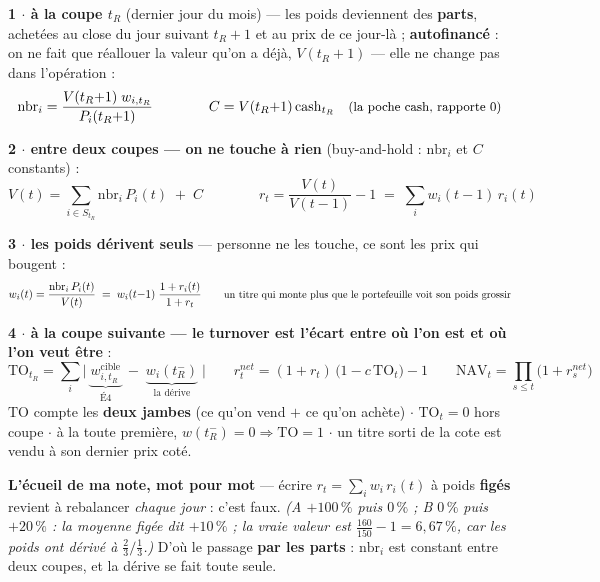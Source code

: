 \documentclass[11pt,a4paper]{article}
\begin{document}
\textbf{1 $\cdot$ à la coupe $t_R$} (dernier jour du mois) --- les poids deviennent des \textbf{parts}, achetées au close du jour suivant $t_R{+}1$
et au prix de ce jour-là ; \textbf{autofinancé} : on ne fait que réallouer la valeur qu'on a déjà, $V(t_R{+}1)$ --- elle ne change pas dans l'opération :
\[
\mathrm{nbr}_i = \frac{V(t_R{+}1)\; w_{i,t_R}}{P_i(t_R{+}1)}
\qquad\qquad
C = V(t_R{+}1)\,\mathrm{cash}_{t_R} \quad \text{\small(la poche cash, rapporte $0$)}
\]

\textbf{2 $\cdot$ entre deux coupes --- on ne touche à rien} (buy-and-hold : $\mathrm{nbr}_i$ et $C$ constants) :
\[
V(t) = \sum_{i \in S_{t_R}} \mathrm{nbr}_i\, P_i(t) \;+\; C
\qquad\qquad
r_t = \frac{V(t)}{V(t-1)} - 1 \;=\; \sum_i w_i(t{-}1)\, r_i(t)
\]

\textbf{3 $\cdot$ les poids dérivent seuls} --- personne ne les touche, ce sont les prix qui bougent :
\[
w_i(t) = \frac{\mathrm{nbr}_i\, P_i(t)}{V(t)} \;=\; w_i(t{-}1)\;\frac{1 + r_i(t)}{1 + r_t}
\qquad \text{\small un titre qui monte plus que le portefeuille voit son poids grossir}
\]

\textbf{4 $\cdot$ à la coupe suivante --- le turnover est l'écart entre où l'on est et où l'on veut être} :
\[
\mathrm{TO}_{t_R} = \sum_i \bigl|\; \underbrace{w^{\text{cible}}_{i,t_R}}_{\text{É4}} \;-\; \underbrace{w_i(t_R^-)}_{\text{la dérive}} \;\bigr|
\qquad
r^{net}_t = (1 + r_t)\,\bigl(1 - c\, \mathrm{TO}_t\bigr) - 1
\qquad
\mathrm{NAV}_t = \prod_{s \le t} \bigl(1 + r^{net}_s\bigr)
\]
$\mathrm{TO}$ compte les \textbf{deux jambes} (ce qu'on vend $+$ ce qu'on achète) $\cdot$ $\mathrm{TO}_t = 0$ hors coupe $\cdot$ à la toute première, $w(t_R^-) = 0 \Rightarrow \mathrm{TO} = 1$ $\cdot$
un titre sorti de la cote est vendu à son dernier prix coté.

\vspace{0.5mm}
\begin{mdframed}[linecolor=rouge, backgroundcolor=rouge!5, linewidth=0.7pt, roundcorner=3pt]
\small\textbf{L'écueil de ma note, mot pour mot} --- écrire $r_t = \sum_i w_i\, r_i(t)$ à poids \textbf{figés} revient à rebalancer
\emph{chaque jour} : c'est faux. \emph{(A $+100\,\%$ puis $0\,\%$ ; B $0\,\%$ puis $+20\,\%$ : la moyenne figée dit $+10\,\%$ ;
la vraie valeur est $\tfrac{160}{150} - 1 = 6{,}67\,\%$, car les poids ont dérivé à $\tfrac23 / \tfrac13$.)}
D'où le passage \textbf{par les parts} : $\mathrm{nbr}_i$ est constant entre deux coupes, et la dérive se fait toute seule.
\end{mdframed}
\end{document}

